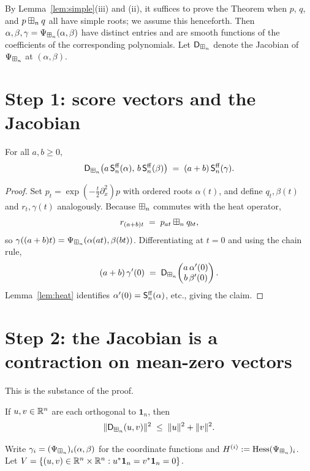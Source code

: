 \documentclass[11pt]{article}
\begin{document}
By Lemma~\ref{lem:simple}(iii) and (ii), it suffices to prove the Theorem when
$p$, $q$, and $p\boxplus_n q$ all have simple roots; we assume this henceforth. Then
$\alpha,\beta,\gamma=\Psi_{\boxplus_n}(\alpha,\beta)$ have distinct entries and are
smooth functions of the coefficients of the corresponding polynomials. Let
$\mathsf{D}_{\boxplus_n}$ denote the Jacobian of $\Psi_{\boxplus_n}$ at $(\alpha,\beta)$.

\section*{Step 1: score vectors and the Jacobian}

\begin{qfourobservation}\label{obs:scores}
For all $a,b\ge0$,
\[
\mathsf{D}_{\boxplus_n}\bigl(a\,\mathsf{S}^{\mathrm{ff}}_n(\alpha),\,b\,\mathsf{S}^{\mathrm{ff}}_n(\beta)\bigr)\;=\;(a+b)\,\mathsf{S}^{\mathrm{ff}}_n(\gamma).
\]
\end{qfourobservation}

\begin{proof}
Set $p_t=\exp(-\tfrac t2\partial_x^2)p$ with ordered roots $\alpha(t)$, and
define $q_t,\beta(t)$ and $r_t,\gamma(t)$ analogously. Because $\boxplus_n$ commutes
with the heat operator,
\[
r_{(a+b)t}\;=\;p_{at}\boxplus_n q_{bt},
\]
so $\gamma((a+b)t)=\Psi_{\boxplus_n}(\alpha(at),\beta(bt))$. Differentiating at
$t=0$ and using the chain rule,
\[
(a+b)\,\gamma'(0)\;=\;\mathsf{D}_{\boxplus_n}\!\begin{pmatrix} a\,\alpha'(0)\\ b\,\beta'(0)\end{pmatrix}.
\]
Lemma~\ref{lem:heat} identifies $\alpha'(0)=\mathsf{S}^{\mathrm{ff}}_n(\alpha)$, etc., giving the
claim.
\end{proof}

\section*{Step 2: the Jacobian is a contraction on mean-zero vectors}

This is the substance of the proof.

\begin{qfourproposition}\label{prop:contraction}
If $u,v\in\mathbb{R}^n$ are each orthogonal to $\mathbf 1_n$, then
\[
\|\mathsf{D}_{\boxplus_n}(u,v)\|^2\;\le\;\|u\|^2+\|v\|^2.
\]
\end{qfourproposition}

Write $\gamma_i=(\Psi_{\boxplus_n})_i(\alpha,\beta)$ for the coordinate functions and
$H^{(i)}:=\operatorname{Hess}(\Psi_{\boxplus_n})_i$. Let
$V=\{(u,v)\in\mathbb{R}^n\times\mathbb{R}^n:u^\ast\mathbf 1_n=v^\ast\mathbf 1_n=0\}$.
\end{document}
